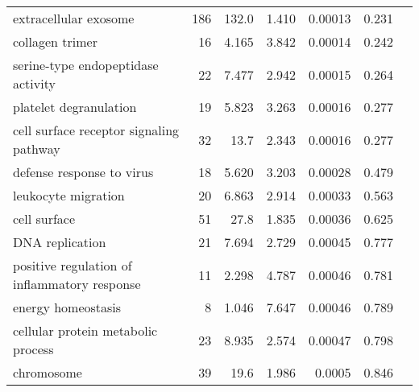 \begin{longtable}{|l|r|r|r|r|r|}
                        extracellular exosome &                     186 &                   132.0 &      1.410 &              0.00013 &                       0.231~~ \\
                              collagen trimer &                      16 &                   4.165 &      3.842 &              0.00014 &                       0.242~~ \\
           serine-type endopeptidase activity &                      22 &                   7.477 &      2.942 &              0.00015 &                       0.264~~ \\
                       platelet degranulation &                      19 &                   5.823 &      3.263 &              0.00016 &                       0.277~~ \\
      cell surface receptor signaling pathway &                      32 &                    13.7 &      2.343 &              0.00016 &                       0.277~~ \\
                    defense response to virus &                      18 &                   5.620 &      3.203 &              0.00028 &                       0.479~~ \\
                          leukocyte migration &                      20 &                   6.863 &      2.914 &              0.00033 &                       0.563~~ \\
                                 cell surface &                      51 &                    27.8 &      1.835 &              0.00036 &                       0.625~~ \\
                              DNA replication &                      21 &                   7.694 &      2.729 &              0.00045 &                       0.777~~ \\
 positive regulation of inflammatory response &                      11 &                   2.298 &      4.787 &              0.00046 &                       0.781~~ \\
                           energy homeostasis &                       8 &                   1.046 &      7.647 &              0.00046 &                       0.789~~ \\
           cellular protein metabolic process &                      23 &                   8.935 &      2.574 &              0.00047 &                       0.798~~ \\
                                   chromosome &                      39 &                    19.6 &      1.986 &               0.0005 &                       0.846~~ \\

\end{longtable}
